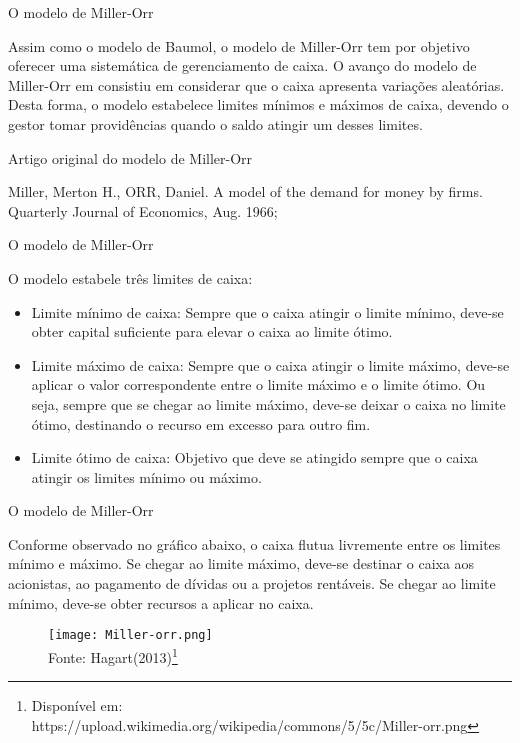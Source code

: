 \documentclass[10pt]{beamer}
\begin{document}
\begin{frame}[fragile]{O modelo de Miller-Orr}

Assim como o modelo de Baumol, o modelo de Miller-Orr tem por objetivo oferecer uma sistemática de gerenciamento de caixa. O avanço do modelo de Miller-Orr em consistiu em considerar que o caixa apresenta variações aleatórias. Desta forma, o modelo estabelece limites mínimos e máximos de caixa, devendo o gestor tomar providências quando o saldo atingir um desses limites.

\end{frame}


\begin{frame}[fragile]{Artigo original do modelo de Miller-Orr}

Miller, Merton H., ORR, Daniel. A model of the demand for money by firms. Quarterly Journal of Economics, Aug. 1966;

\end{frame}

\begin{frame}[fragile]{O modelo de Miller-Orr}

O modelo estabele três limites de caixa:
\begin{itemize}
  \item Limite mínimo de caixa: Sempre que o caixa atingir o limite mínimo, deve-se obter capital suficiente para elevar o caixa ao limite ótimo.
  \item Limite máximo de caixa: Sempre que o caixa atingir o limite máximo, deve-se aplicar o valor correspondente entre o limite máximo e o limite ótimo. Ou seja, sempre que se chegar ao limite máximo, deve-se deixar o caixa no limite ótimo, destinando o recurso em excesso para outro fim.
  \item Limite ótimo de caixa: Objetivo que deve se atingido sempre que o caixa atingir os limites mínimo ou máximo.
\end{itemize}
\end{frame}

\begin{frame}[fragile]{O modelo de Miller-Orr}

Conforme observado no gráfico abaixo, o caixa flutua livremente entre os limites mínimo e máximo. Se chegar ao limite máximo, deve-se destinar o caixa  aos acionistas, ao pagamento de dívidas ou a projetos rentáveis. Se chegar ao limite mínimo, deve-se obter recursos a aplicar no caixa.\\
\begin{figure}
  \begin{center}
    \texttt{[image: Miller-orr.png]}
    \label{fig:Miller-orr}
     \\ \tiny Fonte: Hagart(2013)\footnote{\tiny Disponível em: https://upload.wikimedia.org/wikipedia/commons/5/5c/Miller-orr.png}
  \end{center}
\end{figure}

\end{frame}
\end{document}
